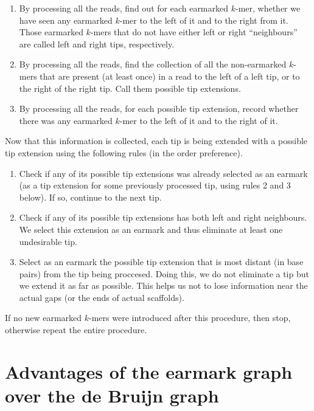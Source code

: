 \documentclass[17pt]{extarticle}
\theoremstyle{definition}
\begin{document}
\begin{multicols}{2}

\begin{enumerate}
\item By processing all the reads, find out for each earmarked $k$-mer, whether we have seen any
earmarked $k$-mer to the left of it and to the right from it.
Those earmarked $k$-mers that do not have either left or right ``neighbours'' are called left and right tips,
respectively.
\item By processing all the reads, find the collection of all the non-earmarked $k$-mers that
are present (at least once) in a read to the left of a left tip, or to the right of the right tip.
Call them possible tip extensions.
\item By processing all the reads, for each possible tip extension, record whether there was
any earmarked $k$-mer to the left of it and to the right of it.
\end{enumerate}

Now that this information is collected, each tip is being extended with
a possible tip extension using the following rules (in the order preference).

\begin{enumerate}
\item Check if any of its possible tip extensions was already selected as an earmark
(as a tip extension for some previously processed tip, using rules 2 and 3 below).
If so, continue to the next tip.
\item Check if any of its possible tip extensions has both left and right neighbours.
We select this extension as an earmark and thus eliminate at least one undesirable tip.
\item Select as an earmark the possible tip extension that is most distant (in base pairs)
from the tip being proccesed. Doing this, we do not eliminate a tip but we extend it as far
as possible. This helps us not to lose information near the actual gaps (or the ends of actual scaffolds).
\end{enumerate}

If no new earmarked $k$-mers were introduced after this procedure, then stop, otherwise repeat the entire procedure.

\section{Advantages of the earmark graph over the de Bruijn 
graph}\label{sec:advantages}


\end{multicols}
\end{document}
